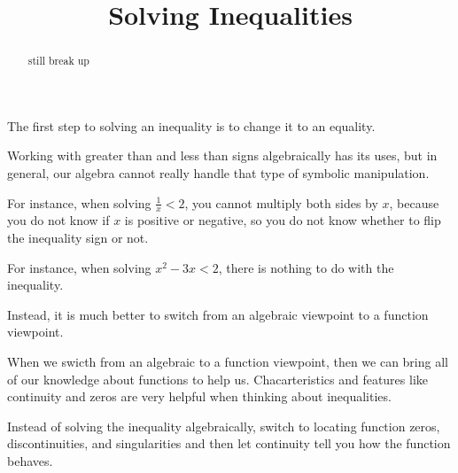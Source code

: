 \documentclass{ximera}
\title{Solving Inequalities}
\begin{document}
\begin{abstract}
still break up
\end{abstract}
\maketitle



The first step to solving an inequality is to change it to an equality. 


Working with greater than and less than signs algebraically has its uses, but in general, our algebra cannot really handle that type of symbolic manipulation. 


For instance, when solving $\frac{1}{x} < 2$, you cannot multiply both sides by $x$, because you do not know if $x$ is positive or negative, so you do not know whether to flip the inequality sign or not.

For instance, when solving $x^2 - 3x < 2$, there is nothing to do with the inequality.


Instead, it is much better to switch from an algebraic viewpoint to a function viewpoint. 


When we swicth from an algebraic to a function viewpoint, then we can bring all of our knowledge about functions to help us. Chacarteristics and features like continuity and zeros are very helpful when thinking about inequalities. 


Instead of solving the inequality algebraically, switch to locating function zeros, discontinuities, and singularities and then let continuity tell you how the function behaves. 
\end{document}
